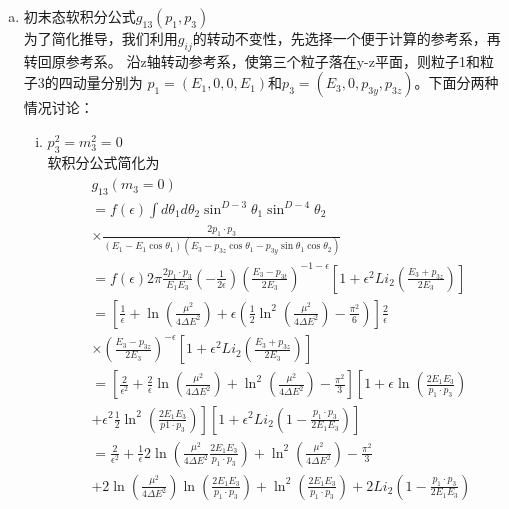 \begin{enumerate}[(a)]
\item 初末态软积分公式$g_{13}(p_1, p_3)$ \\
为了简化推导，我们利用$g_{ij}$的转动不变性，先选择一个便于计算的参考系，再转回原参考系。
沿z轴转动参考系，使第三个粒子落在y-z平面，则粒子1和粒子3的四动量分别为
$p_1 = (E_1, 0, 0, E_1)$和$p_3 = (E_3, 0, p_{3y}, p_{3z})$。下面分两种情况讨论：
\begin{enumerate}[(i)]
\item $p^2_3 = m^2_3 = 0$ \\
软积分公式简化为
\begin{eqnarray}
\begin{split}
& g_{13}(m_3 = 0)  \\
& = f(\epsilon) \int d\theta_1 d\theta_2 \sin^{D-3}\theta_1 \sin^{D-4}\theta_2 
\\
& \times
\frac{2p_1\cdot p_3} {(E_1 - E_1\cos\theta_1)(E_3 - p_{3z}\cos\theta_1 - p_{3y}\sin\theta_1\cos\theta_2)}
\\
&= f(\epsilon) 2\pi \frac{2p_1\cdot p_3}{E_1 E_3} \left(-\frac{1}{2\epsilon}\right) 
\left(\frac{E_3 - p_{3t}}{2E_3}\right)^{-1-\epsilon}\left[1+\epsilon^2 
Li_2\left(\frac{E_3+p_{3z}}{2E_3}\right)\right]
\\
&= \left[ \frac{1}{\epsilon} + \ln\left(\frac{\mu^2}{4\Delta E^2}\right) + \epsilon\left( \frac{1}{2}
\ln^2\left(\frac{\mu^2}{4\Delta E^2}\right) - \frac{\pi^2}{6}\right)\right] \frac{2}{\epsilon}
\\
& \times \left(\frac{E_3-p_{3z}}{2E_3}\right)^{-\epsilon}\left[1 + \epsilon^2 Li_2\left(
\frac{E_3+p_{3z}}{2E_3}\right)\right]
\\
&= \left[ \frac{2}{\epsilon^2} + \frac{2}{\epsilon}\ln\left(\frac{\mu^2}{4\Delta E^2}\right) 
+ \ln^2\left(\frac{\mu^2}{4\Delta E^2}\right) - \frac{\pi^2}{3}\right] \left[ 1 + 
\epsilon\ln\left(\frac{2E_1E_3}{p_1\cdot p_3}\right) \right.
\nonumber \\
& + \left. \epsilon^2 \frac{1}{2}\ln^2\left(\frac{2E_1E_3}{p1\cdot p_3} \right) \right]
\left[1 + \epsilon^2 Li_2\left(1- \frac{p_1\cdot p_3}{2E_1E_3} \right)\right]
\\
&= \frac{2}{\epsilon^2} + \frac{1}{\epsilon} 2\ln\left(\frac{\mu^2}{4\Delta E^2} 
\frac{2E_1E_3}{p_1\cdot p_3}\right) + \ln^2\left(\frac{\mu^2}{4\Delta E^2}\right) - \frac{\pi^2}{3}
\\
&+ 2\ln\left(\frac{\mu^2}{4\Delta E^2}\right)\ln\left(\frac{2E_1E_3}{p_1\cdot p_3}\right)
+ \ln^2\left(\frac{2E_1E_3}{p_1\cdot p_3}\right) + 2Li_2\left(1-\frac{p_1\cdot p_3}{2E_1E_3}\right)
\end{split}
\end{eqnarray}


\end{enumerate}
\end{enumerate}
